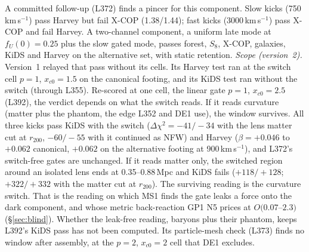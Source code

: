 \documentclass[10pt]{article}
\begin{document}
A committed follow-up (L372) finds a pincer for this component. Slow kicks (750\,km\,s$^{-1}$) pass Harvey but fail X-COP (1.38/1.44); fast kicks (3000\,km\,s$^{-1}$) pass X-COP and fail Harvey. A two-channel component, a uniform late mode at $f_U(0)=0.25$ plus the slow gated mode, passes forest, $S_8$, X-COP, galaxies, KiDS and Harvey on the alternative set, with static retention. \emph{Scope (version~2).} Version~1 relayed that pass without its cells. Its Harvey test ran at the switch cell $p=1$, $x_{c0}=1.5$ on the canonical footing, and its KiDS test ran without the switch (through L355). Re-scored at one cell, the linear gate $p=1$, $x_{c0}=2.5$ (L392), the verdict depends on what the switch reads. If it reads curvature (matter plus the phantom, the edge L352 and DE1 use), the window survives. All three kicks pass KiDS with the switch ($\Delta\chi^2=-41/-34$ with the lens matter cut at $r_{200}$, $-60/-55$ with it continued as NFW) and Harvey ($\beta=+0.046$ to $+0.062$ canonical, $+0.062$ on the alternative footing at 900\,km\,s$^{-1}$), and L372's switch-free gates are unchanged. If it reads matter only, the switched region around an isolated lens ends at 0.35--0.88\,Mpc and KiDS fails ($+118/+128$; $+322/+332$ with the matter cut at $r_{200}$). The surviving reading is the curvature switch. That is the reading on which MS1 finds the gate leaks a force onto the dark component, and whose metric back-reaction GP1 N5 prices at $O(0.07$--$2.3)$ (\S\ref{sec:blind}). Whether the leak-free reading, baryons plus their phantom, keeps L392's KiDS pass has not been computed. Its particle-mesh check (L373) finds no window after assembly, at the $p=2$, $x_{c0}=2$ cell that DE1 excludes.
\end{document}
